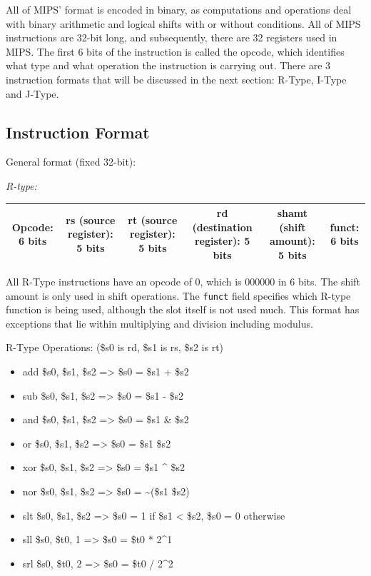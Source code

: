 \documentclass[
    paper=letter,
    parskip=half,
    fontsize=12pt,
    titlepage=firstiscover,
    toc=bibliography,
    numbers=endperiod
]{scrartcl}
\providecommand{\tightlist}{%
  \setlength{\itemsep}{0pt}\setlength{\parskip}{0pt}}
\begin{document}
All of MIPS' format is encoded in binary, as computations and operations
deal with binary arithmetic and logical shifts with or without
conditions. All of MIPS instructions are 32-bit long, and subsequently,
there are 32 registers used in MIPS. The first 6 bits of the instruction
is called the opcode, which identifies what type and what operation the
instruction is carrying out. There are 3 instruction formats that will
be discussed in the next section: R-Type, I-Type and J-Type.

\subsection{Instruction Format}

General format (fixed 32-bit):

\emph{R-type:}

\begin{tabularx}{\textwidth}{|C|C|C|C|C|C|}
    \hline
    Opcode: 6 bits & rs (source register): 5 bits & rt (source register): 5 bits & rd (destination register): 5 bits & shamt (shift amount): 5 bits & funct: 6 bits \\
    \hline
\end{tabularx}

All R-Type instructions have an opcode of 0, which is 000000 in 6 bits.
The shift amount is only used in shift operations. The \texttt{funct}
field specifies which R-type function is being used, although the slot
itself is not used much. This format has exceptions that lie within
multiplying and division including modulus.

R-Type Operations: (\$s0 is rd, \$s1 is rs, \$s2 is rt)

\begin{itemize}
    \tightlist
    \item add \$s0, \$s1, \$s2 =\textgreater{} \$s0 = \$s1 + \$s2
    \item sub \$s0, \$s1, \$s2 =\textgreater{} \$s0 = \$s1 - \$s2
    \item and \$s0, \$s1, \$s2 =\textgreater{} \$s0 = \$s1 \& \$s2
    \item or \$s0, \$s1, \$s2 =\textgreater{} \$s0 = \$s1 \textbar{} \$s2
    \item xor \$s0, \$s1, \$s2 =\textgreater{} \$s0 = \$s1 \^{} \$s2
    \item nor \$s0, \$s1, \$s2 =\textgreater{} \$s0 = \textasciitilde(\$s1
          \textbar{} \$s2)
    \item slt \$s0, \$s1, \$s2 =\textgreater{} \$s0 = 1 if \$s1 \textless{} \$s2,
          \$s0 = 0 otherwise
    \item sll \$s0, \$t0, 1 =\textgreater{} \$s0 = \$t0 * 2\^{}1 \item srl \$s0, \$t0, 2 =\textgreater{} \$s0 = \$t0 / 2\^{}2
\end{itemize}
\end{document}
